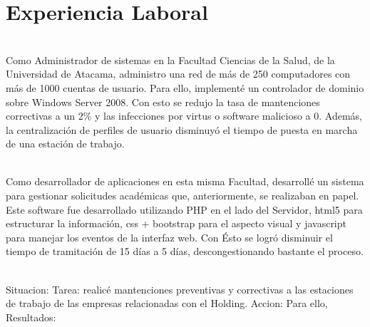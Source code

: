 \documentclass[]{cvStyle1}
\begin{document}
    \section*{Experiencia Laboral}
        {
            \begin{description}[leftmargin=0cm]
                \item [Administrador de Sistemas] \hfill \\
                    Como Administrador de sistemas en la 
                    Facultad Ciencias de la Salud, de la Universidad de
                    Atacama, administro una red de m\'as de 250 
                    computadores con m\'as de 1000 cuentas de usuario.
                    Para ello, implement\'e un controlador de
                    dominio sobre Windows Server 2008.
                    Con esto se redujo la tasa de mantenciones
                    correctivas a un 2\% y las infecciones por virtus o 
                    software malicioso a 0. Adem\'as, la centralizaci\'on
                    de perfiles de usuario disminuy\'o el tiempo de puesta
                    en marcha de una estaci\'on de trabajo.

                \item [Desarrollador de Aplicaciones] \hfill \\
                    Como desarrollador de aplicaciones en esta misma
                    Facultad, desarroll\'e un sistema para gestionar
                    solicitudes acad\'emicas que, anteriormente, se
                    realizaban en papel.
                    Este software fue desarrollado utilizando
                    PHP en el lado del Servidor, html5 para estructurar
                    la informaci\'on, css + bootstrap para el aspecto
                    visual y javascript para manejar los eventos de la
                    interfaz web.
                    Con \'Esto se logr\'o disminuir el tiempo de 
                    tramitaci\'on de 15 d\'ias a 5 d\'ias,
                    descongestionando bastante el proceso.
 
                \item [Soporte Tecnol\'ogico] \hfill \\
                    Situacion:
                    Tarea: realic\'e mantenciones preventivas y
                    correctivas a las estaciones de trabajo de 
                    las empresas relacionadas con el Holding.
                    Accion: Para ello,
                    Resultados:
            \end{description}
        }
                     
\end{document}
